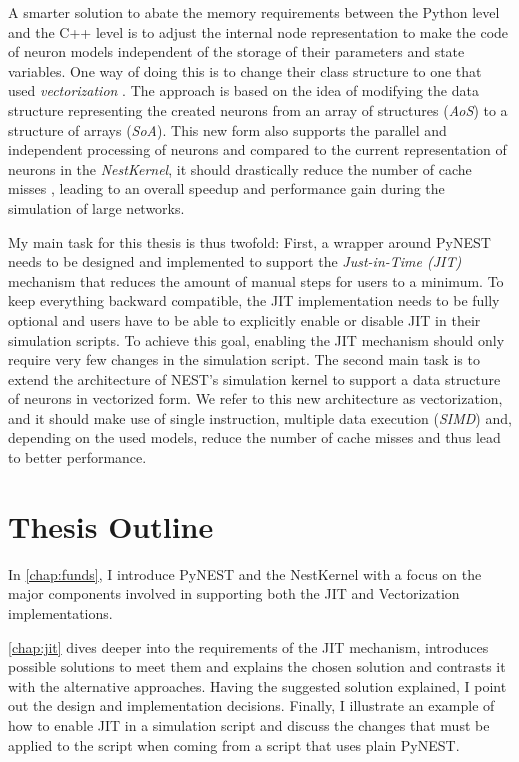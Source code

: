 A smarter solution to abate the memory requirements between the Python level and the C++ level is to adjust the internal node representation to make the code of neuron models independent of the storage of their parameters and state variables. One way of doing this is to change their class structure to one that used \emph{vectorization} \citep{nuzman2006auto}. The approach is based on the idea of modifying the data structure representing the created neurons from an array of structures (\emph{AoS}) to a structure of arrays (\emph{SoA}). This new form also supports the parallel and independent processing of neurons and compared to the current representation of neurons in the \emph{NestKernel}, it should drastically reduce the number of cache misses \citep{ghosh1997cache}, leading to an overall speedup and performance gain during the simulation of large networks.

My main task for this thesis is thus twofold: First, a wrapper around PyNEST needs to be designed and implemented to support the \emph{Just-in-Time (JIT)} mechanism that reduces the amount of manual steps for users to a minimum. To keep everything backward compatible, the JIT implementation needs to be fully optional and users have to be able to explicitly enable or disable JIT in their simulation scripts. To achieve this goal, enabling the JIT mechanism should only require very few changes in the simulation script. The second main task is to extend the architecture of NEST's simulation kernel to support a data structure of neurons in vectorized form. We refer to this new architecture as vectorization, and it should make use of single instruction, multiple data execution (\emph{SIMD}) and, depending on the used models, reduce the number of cache misses and thus lead to better performance.

\section{Thesis Outline}

In \autoref{chap:funds}, I introduce PyNEST and the NestKernel with a focus on the major components involved in supporting both the JIT and Vectorization implementations.

\autoref{chap:jit} dives deeper into the requirements of the JIT mechanism, introduces possible solutions to meet them and explains the chosen solution and contrasts it with the alternative approaches. Having the suggested solution explained, I point out the design and implementation decisions. Finally, I illustrate an example of how to enable JIT in a simulation script and discuss the changes that must be applied to the script when coming from a script that uses plain PyNEST.

